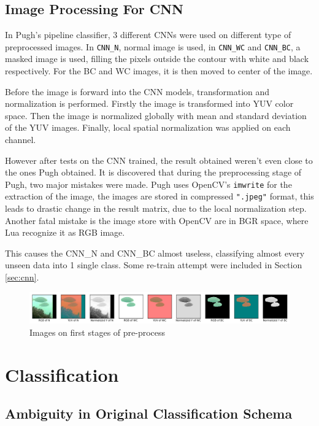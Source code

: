 \documentclass[bsc,logo,twoside,fullspacing,parskip]{infthesis}
\begin{document}
\section{Image Processing For CNN}
\label{sec:CNNprepro}

In Pugh's pipeline classifier, 3 different CNNs were used on different type of preprocessed images.
In  {\tt CNN\_N}, normal image is used, in {\tt CNN\_WC} and {\tt CNN\_BC}, a masked image is used, filling the pixels outside the contour with white and black respectively.
For the BC and WC images, it is then moved to center of the image.

Before the image is forward into the CNN models, transformation and normalization is performed. 
Firstly the image is transformed into YUV color space.
Then the image is normalized globally with mean and standard deviation of the YUV images.
Finally, local spatial normalization was applied on each channel.

However after tests on the CNN trained, the result obtained weren't even close to the ones Pugh obtained.
It is discovered that during the preprocessing stage of Pugh, two major mistakes were made.
Pugh uses OpenCV's {\tt imwrite} for the extraction of the image, the images are stored in compressed {\tt ".jpeg"} format, this leads to drastic change in the result matrix, due to the local normalization step. Another fatal mistake is the image store with OpenCV are in BGR space, where Lua recognize it as RGB image.

This causes the CNN\_N and CNN\_BC almost useless, classifying almost every unseen data into 1 single class. Some re-train attempt were included in Section \ref{sec:cnn}.

\begin{figure}[h]
\centering
    \includegraphics[scale=0.4]{graph/imagepre.png}
    \caption{Images on first stages of pre-process}
    \label{fig:imageprepro}
\end{figure}

\chapter{Classification}
\label{chap:classify}

\section{Ambiguity in Original Classification Schema}
\label{sec:AmbigCS}
\end{document}
